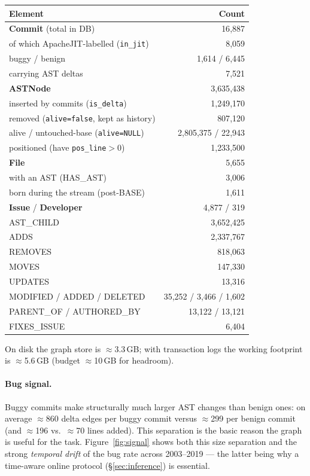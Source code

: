 \documentclass[11pt,a4paper]{article}
\newcommand{\code}[1]{\texttt{#1}}
\newcommand{\node}[1]{\textcolor{kgblue}{\textbf{#1}}}
\newcommand{\edge}[1]{\textsc{#1}}
\begin{document}
\begin{center}
\begin{tabular}{@{}lr@{}}
\toprule
\textbf{Element} & \textbf{Count}\\
\midrule
\node{Commit} (total in DB) & 16{,}887\\
\quad of which ApacheJIT-labelled (\code{in\_jit}) & 8{,}059\\
\quad buggy / benign & 1{,}614 / 6{,}445\\
\quad carrying AST deltas & 7{,}521\\
\node{ASTNode} & 3{,}635{,}438\\
\quad inserted by commits (\code{is\_delta}) & 1{,}249{,}170\\
\quad removed (\code{alive=false}, kept as history) & 807{,}120\\
\quad alive / untouched-base (\code{alive=NULL}) & 2{,}805{,}375 / 22{,}943\\
\quad positioned (have \code{pos\_line}$>$0) & 1{,}233{,}500\\
\node{File} & 5{,}655\\
\quad with an AST (\edge{HAS\_AST}) & 3{,}006\\
\quad born during the stream (post-BASE) & 1{,}611\\
\node{Issue} / \node{Developer} & 4{,}877 / 319\\
\midrule
\edge{AST\_CHILD} & 3{,}652{,}425\\
\edge{ADDS} & 2{,}337{,}767\\
\edge{REMOVES} & 818{,}063\\
\edge{MOVES} & 147{,}330\\
\edge{UPDATES} & 13{,}316\\
\edge{MODIFIED} / \edge{ADDED} / \edge{DELETED} & 35{,}252 / 3{,}466 / 1{,}602\\
\edge{PARENT\_OF} / \edge{AUTHORED\_BY} & 13{,}122 / 13{,}121\\
\edge{FIXES\_ISSUE} & 6{,}404\\
\bottomrule
\end{tabular}
\end{center}

On disk the graph store is $\approx$3.3\,GB; with transaction logs the working
footprint is $\approx$5.6\,GB (budget $\approx$10\,GB for headroom).

\paragraph{Bug signal.} Buggy commits make structurally much larger AST changes
than benign ones: on average $\approx$860 delta edges per buggy commit versus
$\approx$299 per benign commit (and $\approx$196 vs.\ $\approx$70 lines added).
This separation is the basic reason the graph is useful for the task.
Figure~\ref{fig:signal} shows both this size separation and the strong
\emph{temporal drift} of the bug rate across 2003--2019 --- the latter being why
a time-aware online protocol (\S\ref{sec:inference}) is essential.
\end{document}
